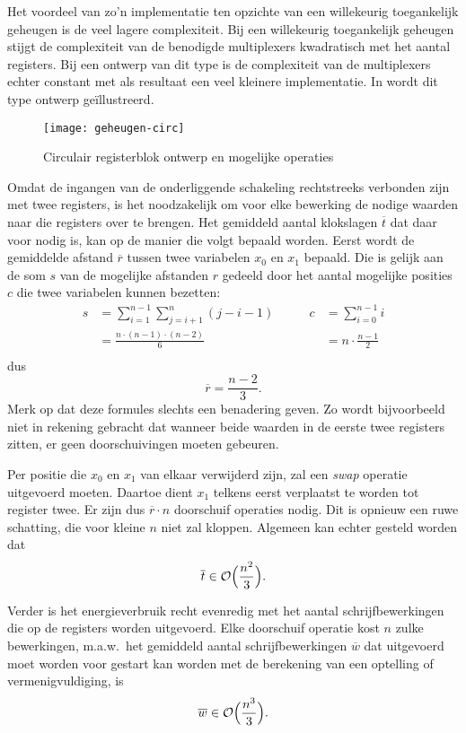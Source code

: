 Het voordeel van zo'n implementatie ten opzichte van een willekeurig toegankelijk geheugen is de veel lagere complexiteit. Bij een willekeurig toegankelijk geheugen stijgt de complexiteit van de benodigde multiplexers kwadratisch met het aantal registers. Bij een ontwerp van dit type is de complexiteit van de multiplexers echter constant met als resultaat een veel kleinere implementatie. In  wordt dit type ontwerp ge\"illustreerd.

\begin{figure}[h]
	\centering
		\texttt{[image: geheugen-circ]}
		\caption{Circulair registerblok ontwerp en mogelijke operaties\label{figuur-implementatie-miller-geheugen-circ}}
\end{figure}

Omdat de ingangen van de onderliggende schakeling rechtstreeks verbonden zijn met twee registers, is het noodzakelijk om voor elke bewerking de nodige waarden naar die registers over te brengen. Het gemiddeld aantal klokslagen $\overline{t}$ dat daar voor nodig is, kan op de manier die volgt bepaald worden. Eerst wordt de gemiddelde afstand $\overline{r}$ tussen twee variabelen $x_0$ en $x_1$ bepaald. Die is gelijk aan de som $s$ van de mogelijke afstanden $r$ gedeeld door het aantal mogelijke posities $c$ die twee variabelen kunnen bezetten:
\[\begin{aligned}
s	&= \sum_{i = 1}^{n - 1} \sum_{j = i + 1}^n (j - i - 1)
	&\qquad c	&= \sum_{i = 0}^{n - 1} i\\
	&= \frac{n \cdot (n - 1) \cdot (n - 2)}{6}
	&	&= n \cdot \frac{n - 1}{2}\\
\end{aligned}\]
dus
\[\overline{r}	= \frac{n - 2}{3}.\]
Merk op dat deze formules slechts een benadering geven. Zo wordt bijvoorbeeld niet in rekening gebracht dat wanneer beide waarden in de eerste twee registers zitten, er geen doorschuivingen moeten gebeuren.

Per positie die $x_0$ en $x_1$ van elkaar verwijderd zijn, zal een \emph{swap} operatie uitgevoerd moeten. Daartoe dient $x_1$ telkens eerst verplaatst te worden tot register twee. Er zijn dus $\overline{r} \cdot n$ doorschuif operaties nodig. Dit is opnieuw een ruwe schatting, die voor kleine $n$ niet zal kloppen. Algemeen kan echter gesteld worden dat
\[\overline{t} \in \mathcal{O} \Bigl( \frac{n^2}{3} \Bigr).\]

Verder is het energieverbruik recht evenredig met het aantal schrijfbewerkingen die op de registers worden uitgevoerd. Elke doorschuif operatie kost $n$ zulke bewerkingen, m.a.w.\ het gemiddeld aantal schrijfbewerkingen $\overline{w}$ dat uitgevoerd moet worden voor gestart kan worden met de berekening van een optelling of vermenigvuldiging, is
\[\overline{w} \in \mathcal{O} \Bigl( \frac{n^3}{3} \Bigr).\]

